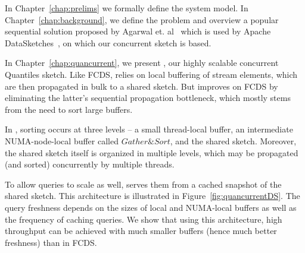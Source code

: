In Chapter~\ref{chap:prelims} we formally define the system model. In Chapter~\ref{chap:background}, we define the problem and overview a popular sequential solution proposed by Agarwal et. al~\cite{mergeables_summaries} which is used by Apache DataSketches~\cite{DataSketches}, on which our concurrent sketch is based.


In Chapter~\ref{chap:quancurrent}, we present \mysketch, our highly scalable concurrent Quantiles sketch.
Like FCDS, \mysketch relies on local buffering of stream elements, which are then propagated in bulk to a shared sketch.
But \mysketch improves on FCDS by eliminating the latter's sequential propagation bottleneck, which mostly stems from the need to sort large buffers.

In \mysketch, sorting occurs at three levels – a small thread-local buffer, an intermediate NUMA-node-local buffer called $\mathit{Gather\&Sort}$, and the shared sketch.
Moreover, the shared sketch itself is organized in multiple levels, which may be propagated (and sorted) concurrently by multiple threads.

To allow queries to scale as well, \mysketch serves them from a cached snapshot of the shared sketch.
This architecture is illustrated in Figure~\ref{fig:quancurrentDS}.
The query freshness depends on the sizes of local and NUMA-local buffers as well as the frequency of caching queries.
We show that using this architecture, high throughput can be achieved with much smaller buffers (hence much better freshness) than in FCDS.




